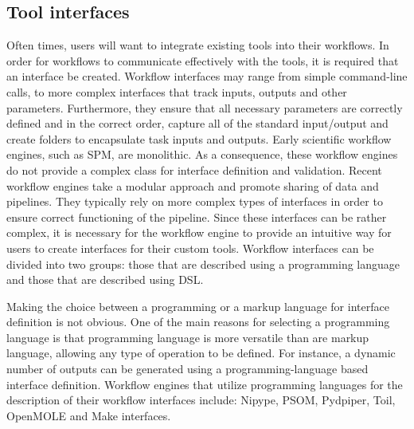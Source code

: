         \subsection{Tool interfaces}\label{mod} Often times, users will want to
            integrate existing tools into their workflows. In order for
            workflows to communicate effectively with the tools, it is required
            that an interface be created. Workflow interfaces may range from
            simple command-line calls, to more complex interfaces that track
            inputs, outputs and other parameters. Furthermore, they ensure that
            all necessary parameters are correctly defined and in the correct
            order,  capture all of the standard input/output and create folders
            to encapsulate task inputs and outputs. Early scientific workflow
            engines, such as SPM, are monolithic. As a consequence, these
            workflow engines do not provide a complex class for interface
            definition and validation. Recent workflow engines take a modular
            approach and promote sharing of data and pipelines. They typically
            rely on more complex types of interfaces in order to ensure correct
            functioning of the pipeline. Since these interfaces can be rather
            complex, it is necessary for the workflow engine to provide an
            intuitive way for users to create interfaces for their custom tools.
            Workflow interfaces can be divided into two groups: those that are
            described using a programming language and those that are described
            using DSL.

            Making the choice between a programming or a markup language for
            interface definition is not obvious. One of the main reasons for
            selecting a programming language is that programming language is
            more versatile than are markup language, allowing any type of
            operation to be defined. For instance, a dynamic number of outputs
            can be generated using a programming-language based interface
            definition. Workflow engines that utilize programming languages for
            the description of their workflow interfaces include: Nipype, PSOM,
            Pydpiper, Toil, OpenMOLE and Make interfaces. 
          
